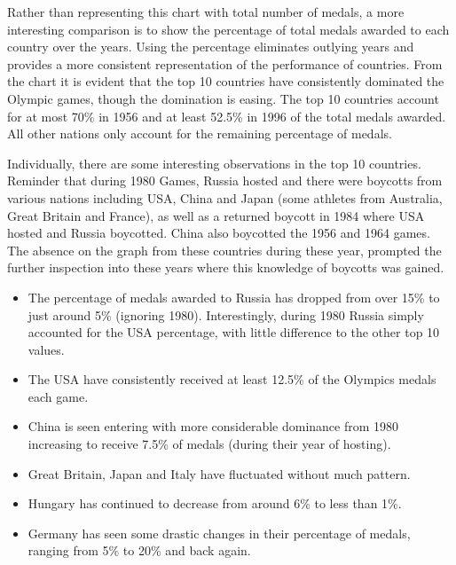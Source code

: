\documentclass[a4 paper, 12pt]{article}
\begin{document}
        Rather than representing this chart with total number of medals, a more interesting comparison is to show the percentage of total medals awarded to each country over the years. Using the percentage eliminates outlying years and provides a more consistent representation of the performance of countries. From the chart it is evident that the top 10 countries have consistently dominated the Olympic games, though the domination is easing. The top 10 countries account for at most 70\% in 1956 and at least 52.5\% in 1996 of the total medals awarded. All other nations only account for the remaining percentage of medals. 

        Individually, there are some interesting observations in the top 10 countries. Reminder that during 1980 Games, Russia hosted and there were boycotts from various nations including USA, China and Japan (some athletes from Australia, Great Britain and France), as well as a returned boycott in 1984 where USA hosted and Russia boycotted. China also boycotted the 1956 and 1964 games. The absence on the graph from these countries during these year, prompted the further inspection into these years where this knowledge of boycotts was gained.
        \begin{itemize}
            \item The percentage of medals awarded to Russia has dropped from over 15\% to just around 5\% (ignoring 1980). Interestingly, during 1980 Russia simply accounted for the USA percentage, with little difference to the other top 10 values.
            \item The USA have consistently received at least 12.5\% of the Olympics medals each game.
            \item China is seen entering with more considerable dominance from 1980 increasing to receive 7.5\% of medals (during their year of hosting).
            \item Great Britain, Japan and Italy have fluctuated without much pattern.
            \item Hungary has continued to decrease from around 6\% to less than 1\%.
            \item Germany has seen some drastic changes in their percentage of medals, ranging from 5\% to 20\% and back again. 
        \end{itemize}          
\end{document}
